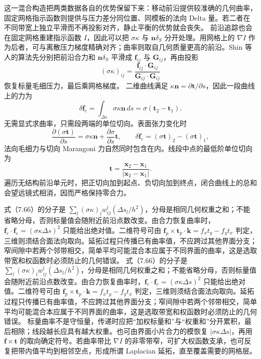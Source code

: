 \documentclass[11pt,a4paper,openany,fontset=none]{ctexbook}
\begin{document}
这一混合构造把两类数据各自的优势保留下来：移动前沿提供较准确的几何曲率，固定网格指示函数则提供与压力差分同位置、同模板的法向 Delta 量。若二者在不同带宽上独立平滑而不再投影对齐，静止平衡的优势就会丧失。
前沿追踪也会在固定网格重建指示函数 $I$，因此可以把 $\sigma\kappa$ 与 $\boldsymbol n\delta_S$ 分开处理。用网格上的 $\nabla I$ 作为后者，可与离散压力梯度精确对齐；曲率则取自几何质量更高的前沿。Shin 等人的算法先分别把前沿合力和 $\boldsymbol n\delta_S$ 平滑成 $\boldsymbol f_{ij}$ 与 $\boldsymbol G_{ij}$，再由投影
\begin{equation}
(\sigma\kappa)_{ij}=\frac{\boldsymbol f_{ij}\cdot\boldsymbol G_{ij}}
{\boldsymbol G_{ij}\cdot\boldsymbol G_{ij}}
\tag{7.65}
\end{equation}
恢复标量毛细压力，最后乘网格梯度。
二维曲线满足 $\kappa\boldsymbol n=\partial\boldsymbol t/\partial s$，因此一段曲线上的力为
\begin{equation}
 \delta\boldsymbol f_e
 =\int_{\Delta s}\sigma\kappa\boldsymbol n\,ds
 =\sigma(\boldsymbol t_2-\boldsymbol t_1).
 \tag{7.47}
\end{equation}
无需显式求曲率，只需段两端的单位切向。表面张力变化时
\begin{equation}
 \frac{\partial(\sigma\boldsymbol t)}{\partial s}
 =\sigma\kappa\boldsymbol n+\frac{\partial\sigma}{\partial s}\boldsymbol t,
 \qquad
 \delta\boldsymbol f_e=(\sigma\boldsymbol t)_2-(\sigma\boldsymbol t)_1,
 \tag{7.48--7.49}
\end{equation}
法向毛细力与切向 Marangoni 力自然同时包含在内。线段中点的最低阶单位切向为
\begin{equation}
 \boldsymbol t=\frac{\boldsymbol x_2-\boldsymbol x_1}
 {|\boldsymbol x_2-\boldsymbol x_1|}.
 \tag{7.50}
\end{equation}
遍历无结构前沿单元时，把正切向加到起点、负切向加到终点，闭合曲线上的总和会望远镜式相消，因而严格保持零合力。

式（7.66）的分子是 $\sum_l(\sigma\kappa)_lw^l_{ij}(\Delta s_l/h^2)$，分母是相同几何权重之和；不能省略分母，否则标量值会随附近前沿点数改变。由合力恢复曲率时，$\boldsymbol f_e\cdot\boldsymbol f_e=(\sigma\kappa\Delta s)^2$ 只能给出绝对值。二维符号可由 $\boldsymbol f_p\times\boldsymbol t_p\cdot\boldsymbol k=f_xt_y-f_yt_x$ 判定，三维则须结合面法向取向。延拓过程只传播已有曲率值，不应跨过其他界面分支；窄间隙中若两个邻带相交，简单平均可能混合本应属于不同界面的曲率，这是选取带宽和权函数时必须防止的几何错误。
式（7.66）的分子是 $\sum_l(\sigma\kappa)_lw^l_{ij}(\Delta s_l/h^2)$，分母是相同几何权重之和；不能省略分母，否则标量值会随附近前沿点数改变。由合力恢复曲率时，$\boldsymbol f_e\cdot\boldsymbol f_e=(\sigma\kappa\Delta s)^2$ 只能给出绝对值。二维符号可由 $\boldsymbol f_p\times\boldsymbol t_p\cdot\boldsymbol k=f_xt_y-f_yt_x$ 判定，三维则须结合面法向取向。延拓过程只传播已有曲率值，不应跨过其他界面分支；窄间隙中若两个邻带相交，简单平均可能混合本应属于不同界面的曲率，这是选取带宽和权函数时必须防止的几何错误。
标量曲率不是守恒量，传递时应把“加权标量和”与“权重和”分开累积，最后相除；线段越长应具有越大权重。也可由界面小片合力的模恢复 $|\sigma\kappa\Delta s|$，再用 $\boldsymbol f\times\boldsymbol t$ 的取向确定符号。若曲率带比 $\nabla I$ 的非零带窄，可扩大权函数支承，也可反复把带内值平均到相邻空点，形成所谓 Laplacian 延拓，直至覆盖需要的网格层。
\end{document}
